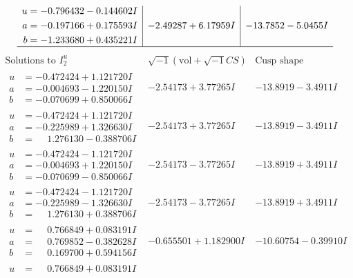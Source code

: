 \documentclass[1p]{elsarticle_modified}
\theoremstyle{definition}
\newcommand{\I}{\sqrt{-1}}
\begin{document}
$$\begin{array}{c|c|c}
\begin{aligned}
u &= -0.796432 - 0.144602 I \\
a &= -0.197166 + 0.175593 I \\
b &= -1.233680 + 0.435221 I\end{aligned}
 & -2.49287 + 6.17959 I & -13.7852 - 5.0455 I\\
 \hline 
 \end{array}$$\newpage$$\begin{array}{c|c|c}  
\text{Solutions to }I^u_{2}& \I (\text{vol} + \sqrt{-1}CS) & \text{Cusp shape}\\
 \hline 
\begin{aligned}
u &= -0.472424 + 1.121720 I \\
a &= -0.004693 - 1.220150 I \\
b &= -0.070699 + 0.850066 I\end{aligned}
 & -2.54173 + 3.77265 I & -13.8919 - 3.4911 I \\ \hline\begin{aligned}
u &= -0.472424 + 1.121720 I \\
a &= -0.225989 + 1.326630 I \\
b &= \phantom{-}1.276130 - 0.388706 I\end{aligned}
 & -2.54173 + 3.77265 I & -13.8919 - 3.4911 I \\ \hline\begin{aligned}
u &= -0.472424 - 1.121720 I \\
a &= -0.004693 + 1.220150 I \\
b &= -0.070699 - 0.850066 I\end{aligned}
 & -2.54173 - 3.77265 I & -13.8919 + 3.4911 I \\ \hline\begin{aligned}
u &= -0.472424 - 1.121720 I \\
a &= -0.225989 - 1.326630 I \\
b &= \phantom{-}1.276130 + 0.388706 I\end{aligned}
 & -2.54173 - 3.77265 I & -13.8919 + 3.4911 I \\ \hline\begin{aligned}
u &= \phantom{-}0.766849 + 0.083191 I \\
a &= \phantom{-}0.769852 - 0.382628 I \\
b &= \phantom{-}0.169700 + 0.594156 I\end{aligned}
 & -0.655501 + 1.182900 I & -10.60754 - 0.39910 I \\ \hline\begin{aligned}
u &= \phantom{-}0.766849 + 0.083191 I \\

\end{aligned}
\end{array}$$
\end{document}
